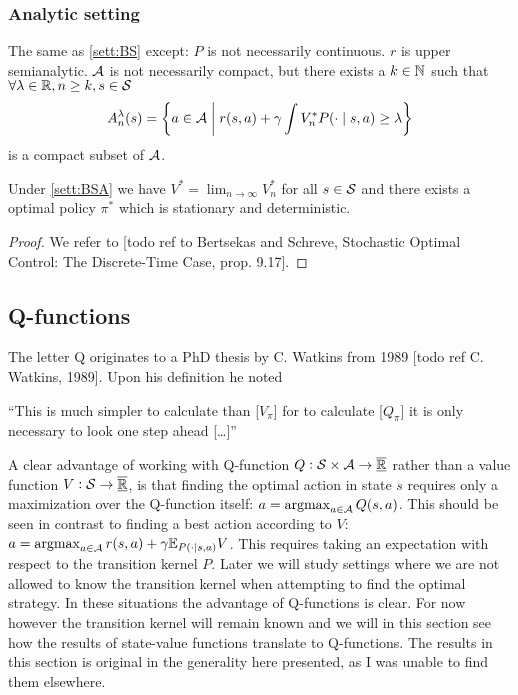 \subsubsection{Analytic setting}

\begin{sett}[BS Analytic]
  The same as \cref{sett:BS} except:
  $P$ is not necessarily continuous.
  $r$ is upper semianalytic.
  $\mathcal{A}$ is not necessarily compact, but
  there exists a $k \in \mathbb{N}$ such that
  $\forall \lambda \in \mathbb{R}, n \geq k, s \in \mathcal{S}$
  \[ A^\lambda_n(s) = \left\{ a \in \mathcal{A} \;\middle\vert\; r(s, a)
  + \gamma \int V^*_n P(\cdot \mid s, a) \geq \lambda \right\} \]
  is a compact subset of $\mathcal{A}$.
  \label{sett:BSA}
\end{sett}

\begin{thm}[Prop. 9.17 BS]
  Under \cref{sett:BSA} we have
  $V^* = \lim_{n \to \infty} V^*_n$ for all $s \in \mathcal{S}$
  and there exists a optimal policy $\pi^*$ which is stationary
  and deterministic.
\end{thm}
\begin{proof}
  We refer to [todo ref to Bertsekas and Schreve, Stochastic Optimal Control:
  The Discrete-Time Case, prop. 9.17].
\end{proof}

\subsection{Q-functions}

The letter Q originates to a PhD thesis by C. Watkins from 1989
[todo ref C. Watkins, 1989]. Upon his definition he noted
\begin{displayquote}
  ``This is much simpler to calculate than [$V_\pi$]
  for to calculate [$Q_\pi$] it is only necessary to look one
  step ahead [\ldots]''
\end{displayquote}
A clear advantage of working with Q-function
$Q:\mathcal{S}\times\mathcal{A} \to \overline{\underline{\mathbb{R}}}$ rather than a value function
$V:\mathcal{S}\to \overline{\underline{\mathbb{R}}}$,
is that finding the optimal action in state $s$
requires only a maximization over the Q-function itself:
$a = \operatorname*{argmax}_{a \in \mathcal{A}} Q(s,a)$.
This should be seen in contrast to finding a best action according to $V$:
$a = \operatorname*{argmax}_{a \in \mathcal{A}} r(s,a) + \gamma \mathbb{E}_{P(\cdot \mid s,a)} V$.
This requires taking an expectation with respect to the transition kernel
$P$. Later we will study settings where we are not allowed to know
the transition kernel when attempting to find the optimal strategy.
In these situations the advantage of Q-functions is clear.
For now however the transition kernel will remain known and we
will in this section see how the results of state-value functions
translate to Q-functions.
The results in this section is original in the generality here presented,
as I was unable to find them elsewhere.

